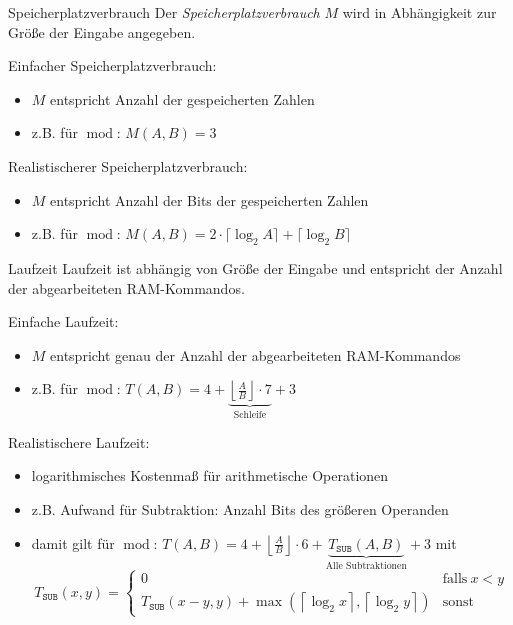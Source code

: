 \documentclass[german]{../spicker}
\begin{document}
\begin{defi}{Speicherplatzverbrauch}
  Der \emph{Speicherplatzverbrauch} $M$ wird in Abhängigkeit zur Größe der Eingabe angegeben.

  Einfacher Speicherplatzverbrauch:
  \begin{itemize}
    \item $M$ entspricht Anzahl der gespeicherten Zahlen
    \item z.B. für $\operatorname{mod}$: $M(A, B) = 3$
  \end{itemize}

  Realistischerer Speicherplatzverbrauch:
  \begin{itemize}
    \item $M$ entspricht Anzahl der Bits der gespeicherten Zahlen
    \item z.B. für $\operatorname{mod}$: $M(A, B) = 2 \cdot \lceil \log_2 A \rceil + \lceil \log_2 B \rceil$
  \end{itemize}
\end{defi}

\begin{defi}{Laufzeit}
  Laufzeit ist abhängig von Größe der Eingabe und entspricht der Anzahl der abgearbeiteten RAM-Kommandos.

  Einfache Laufzeit:
  \begin{itemize}
    \item $M$ entspricht genau der Anzahl der abgearbeiteten RAM-Kommandos
    \item z.B. für $\operatorname{mod}$: $T(A, B) = 4 + \underbrace{\left\lfloor \frac{A}{B} \right\rfloor \cdot 7}_{\text{Schleife}} + 3$
  \end{itemize}

  Realistischere Laufzeit:
  \begin{itemize}
    \item logarithmisches Kostenmaß für arithmetische Operationen
    \item z.B. Aufwand für Subtraktion: Anzahl Bits des größeren Operanden
    \item damit gilt für $\operatorname{mod}$: $T(A, B) = 4 + \left\lfloor \frac{A}{B} \right\rfloor \cdot 6 + \underbrace{T_{\texttt{SUB}}(A, B)}_{\text{Alle Subtraktionen}} + 3$
          mit
          $$
            T_{\texttt{SUB}}(x, y) = \begin{cases}
              0                                                                                                      & \text{falls} \ x < y \\
              T_{\texttt{SUB}}(x-y, y) + \max (\left\lceil \log_2 x \right\rceil, \left\lceil \log_2 y \right\rceil) & \text{sonst}
            \end{cases}
          $$
  \end{itemize}
\end{defi}

\printindex
\printindex[Beispiele]

\printbibliography
\end{document}
